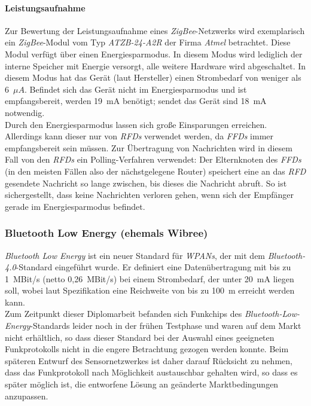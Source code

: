             \paragraph{Leistungsaufnahme}
                Zur Bewertung der Leistungsaufnahme eines \emph{ZigBee}-Netzwerks wird exemplarisch ein 
                \emph{ZigBee}-Modul
                vom Typ \emph{ATZB-24-A2R} der Firma \emph{Atmel} betrachtet. Diese Modul verfügt über einen 
                Energiesparmodus.  In diesem Modus wird lediglich der interne Speicher mit Energie versorgt, alle 
                weitere Hardware wird abgeschaltet. In diesem Modus hat das Gerät (laut Hersteller) einen Strombedarf 
                von weniger als 6~$\mu{}A$. Befindet sich das Gerät nicht im Energiesparmodus und ist empfangsbereit, 
                werden 19~mA benötigt; sendet das Gerät sind 18~mA notwendig.\\
                Durch den Energiesparmodus lassen sich große Einsparungen erreichen. Allerdings kann dieser nur von 
                \emph{RFDs} verwendet werden, da \emph{FFDs} immer empfangsbereit sein müssen. Zur Übertragung von 
                Nachrichten wird in diesem Fall von den \emph{RFDs} ein Polling-Verfahren verwendet: Der Elternknoten des 
                \emph{FFDs} (in den meisten Fällen also der nächstgelegene Router) speichert eine an das \emph{RFD}
                gesendete Nachricht so lange zwischen,
                bis dieses die Nachricht abruft. So ist sichergestellt, dass keine Nachrichten verloren gehen, wenn
                sich der Empfänger gerade im Energiesparmodus befindet.
           

        \subsubsection{Bluetooth Low Energy (ehemals Wibree)}\label{wibree}
            \emph{Bluetooth Low Energy} ist ein neuer Standard für \emph{WPANs}, der mit dem \emph{Bluetooth-4.0}-Standard 
            eingeführt wurde. Er definiert eine Datenübertragung mit bis zu 1~MBit/s (netto 0,26~MBit/s) bei einem 
            Strombedarf, der unter 20~mA liegen soll, wobei laut Spezifikation eine Reichweite von bis zu 100~m erreicht werden 
            kann.\\
            Zum Zeitpunkt dieser Diplomarbeit befanden sich Funkchips des \emph{Bluetooth-Low-Energy}-Standards 
            leider noch in der frühen Testphase und waren auf dem Markt nicht erhältlich, so dass dieser Standard 
            bei der Auswahl eines geeigneten Funkprotokolls nicht in die engere Betrachtung gezogen werden konnte.
            Beim späteren Entwurf des Sensornetzwerkes
            ist daher darauf Rücksicht zu nehmen, dass das Funkprotokoll nach Möglichkeit austauschbar gehalten wird,
            so dass es später möglich ist, die entworfene Lösung an geänderte Marktbedingungen anzupassen.
            

